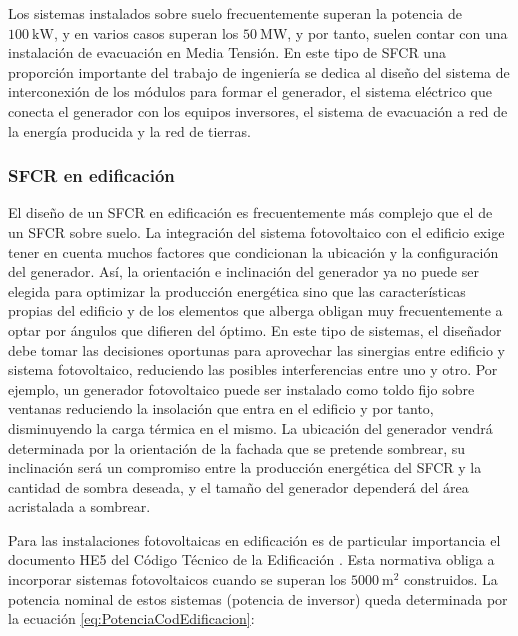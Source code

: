 Los sistemas instalados sobre suelo frecuentemente superan la potencia
de $\SI{100}{\kilo\watt}$, y en varios casos superan los $\SI{50}{\mega\watt}$,
y por tanto, suelen contar con una instalación de evacuación en Media
Tensión. En este tipo de SFCR una proporción importante del trabajo
de ingeniería se dedica al diseño del sistema de interconexión de los
módulos para formar el generador, el sistema eléctrico que conecta
el generador con los equipos inversores, el sistema de evacuación
a red de la energía producida y la red de tierras.


\subsubsection{SFCR en edificación}

El diseño de un SFCR en edificación es frecuentemente más complejo
que el de un SFCR sobre suelo. La integración del sistema fotovoltaico
con el edificio exige tener en cuenta muchos factores que condicionan
la ubicación y la configuración del generador. Así, la orientación
e inclinación del generador ya no puede ser elegida para optimizar
la producción energética sino que las características propias del
edificio y de los elementos que alberga obligan muy frecuentemente
a optar por ángulos que difieren del óptimo. En este tipo de sistemas,
el diseñador debe tomar las decisiones oportunas para aprovechar las
sinergias entre edificio y sistema fotovoltaico, reduciendo las posibles
interferencias entre uno y otro. Por ejemplo, un generador fotovoltaico
puede ser instalado como toldo fijo sobre ventanas reduciendo la insolación
que entra en el edificio y por tanto, disminuyendo la carga térmica
en el mismo. La ubicación del generador vendrá determinada por la
orientación de la fachada que se pretende sombrear, su inclinación
será un compromiso entre la producción energética del SFCR y la cantidad
de sombra deseada, y el tamaño del generador dependerá del área acristalada
a sombrear. 

Para las instalaciones fotovoltaicas en edificación es de particular
importancia el documento HE5 del Código Técnico de la
Edificación \cite{CTE2017}.
Esta normativa obliga a incorporar sistemas fotovoltaicos cuando se
superan los $\SI{5000}{\meter\squared}$ construidos. La potencia
nominal de estos sistemas (potencia de inversor) queda determinada por
la ecuación \ref{eq:PotenciaCodEdificacion}:

